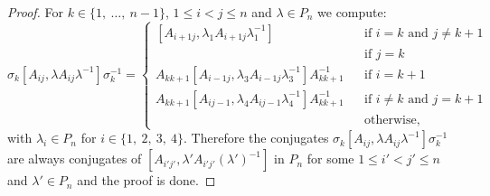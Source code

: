 \documentclass[10pt,a4paper]{amsart}
\begin{document}
\begin{proof}
For $k\in\{1,\ \ldots,\ n-1\}$, $1\leq i<j\leq n$ and $\lambda \in P_n$ we compute:
$$\sigma_k[A_{ij},\lambda A_{ij}\lambda^{-1}]\sigma_k^{-1}=\left\{
\begin{array}{lcl}
[A_{i+1j},\lambda_1 A_{i+1j}\lambda_1^{-1}]&&\text{if }i=k\text{ and }j\neq k+1 \\

[A_{i+1j},\lambda_2 A_{i+1j}\lambda_2^{-1}]&&\text{if }j=k\\

A_{kk+1}[A_{i-1j},\lambda_3 A_{i-1j}\lambda_3^{-1}]A_{kk+1}^{-1}&&\text{if }i=k+1\\

A_{kk+1}[A_{ij-1},\lambda_4 A_{ij-1}\lambda_4^{-1}]A_{kk+1}^{-1}&&\text{if }i\neq k\text{ and }j=k+1\\

[A_{ij},\lambda A_{ij}\lambda^{-1}]&&\text{otherwise},
\end{array}\right.$$
with $\lambda_i\in P_n$ for $i\in\{1,\ 2,\ 3,\ 4\}$. Therefore the conjugates $\sigma_k[A_{ij},\lambda A_{ij}\lambda^{-1}]\sigma_k^{-1}$ are always conjugates of $[A_{i'j'},\lambda' A_{i'j'}(\lambda')^{-1}]$ in $P_n$ for some $1\leq i'<j'\leq n$ and $\lambda'\in P_n$ and the proof is done.
\end{proof}
\end{document}
